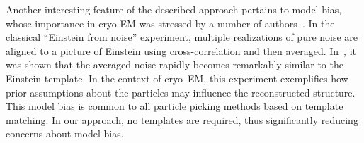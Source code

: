 \documentclass[english,11pt]{article}
\newcommand{\1}{\mathbf{1}}
\newcommand{\TODO}[1]{{\color{red}{[#1]}}}
\numberwithin{equation}{section}
\theoremstyle{plain}
\theoremstyle{definition}
\theoremstyle{remark}
\theoremstyle{plain}
\theoremstyle{remark}
\theoremstyle{plain}
\theoremstyle{plain}
\begin{document}
Another interesting feature of the described approach pertains to model bias, whose importance in cryo-EM was stressed by a number of authors~\cite{shatsky2009method,vanheel1992correlation,henderson2013avoiding,vanheel2013finding}. In the classical ``Einstein from noise'' experiment, multiple realizations of pure noise are aligned to a picture of Einstein using cross-correlation and then averaged. In~\cite{shatsky2009method}, it was shown that the averaged noise rapidly becomes remarkably similar to the Einstein template. In the context of cryo--EM, this experiment exemplifies how prior assumptions about the particles may influence the reconstructed structure. This model bias is common to all particle picking methods based on template matching. In our approach, no templates are required, thus significantly reducing concerns about model bias. \TODO{To add reference to our example.}








\end{document}
